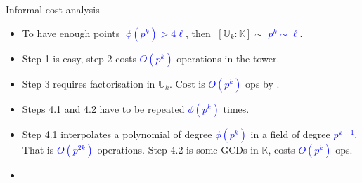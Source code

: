 \documentclass[10pt]{beamer}
\newcommand{\blue}[1]{\textcolor{blue}{#1}}  %
\newcommand{\K}{\mathbb{K}}  %
\newcommand{\U}{\mathbb{U}}  %
\newcommand{\euler}{\phi}  %
\newcommand{\0}{\mathcal{O}}  %
\begin{document}
\begin{frame}
  \begin{block}{\alert<2>{Informal} cost analysis}
    \begin{itemize}
    \item To have enough points \blue{$\;\euler(p^k) > 4\ell$}, then
      $\;[\U_k:\K] \sim$ \blue{$p^k \sim \ell$}.
    \item Step 1 is easy, step 2 costs \blue{$O(p^k)$}
      \alert<2>{operations in the tower}.
    \item \alert<1>{Step 3 requires factorisation in $\U_k$. Cost is
      \blue{$O(p^{k})$} \alert<2>{ops} by \cite{Couveignes00}.}
    \item Steps 4.1 and 4.2 have to be repeated
      \blue{$\euler(p^k)$} times.
    \item Step 4.1 interpolates a polynomial of degree
      \blue{$\euler(p^k)$} in a field of degree \blue{$p^{k-1}$}. That
      is \blue{$O(p^{2k})$} \alert<2>{operations}. Step 4.2 is some GCDs
      in $\K$, costs \blue{$O(p^k)$} \alert<2>{ops}.
    \item {}
    \end{itemize}
  \end{block}
\end{frame}

\end{document}
